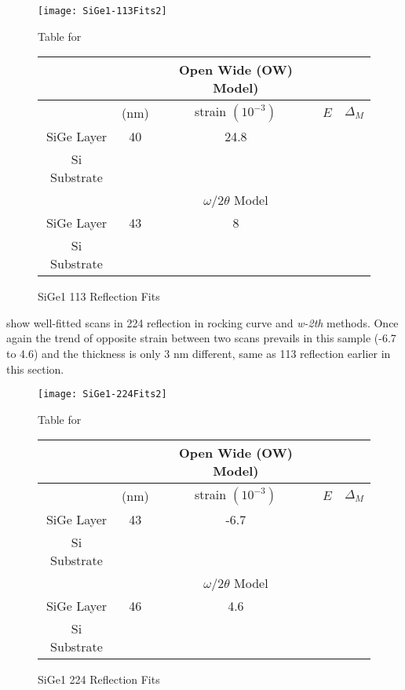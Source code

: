 \begin{figure}[hc]%
\caption{SiGe1 113 Reflection Fits}
\label{SiGe1-113}
\begin{minipage}{0.85\linewidth}
\texttt{[image: SiGe1-113Fits2]}
\end{minipage}
\begin{minipage}{\linewidth}
\centering
\vspace{10pt}
Table for \\
\vspace{5pt}
\begin{tabular}{c|cccc}
			& 	&Open Wide (OW) Model)	 \\
\hline
			&	(nm)	&	strain	 $(10^{-3})$&	$E$ &  $\Delta_M$\\
\hline
SiGe Layer		&  	40	&   24.8	 &\textendash & \textendash\ 	\\
Si Substrate		&	\textemdash & \textemdash&\textemdash\ &\textemdash	\\
\hline
			& &$\omega/2\theta$ Model \\
\hline
SiGe Layer		&	43	& 8	&\textendash&\textendash\ 	\\
Si Substrate		&	\textemdash & \textemdash&\textemdash\ &\textemdash
\end{tabular}
\end{minipage}
\end{figure}

  show well-fitted scans in 224 reflection in rocking curve and \emph{w-2th} methods.  Once again the trend of opposite strain between two scans prevails in this sample (-6.7 to 4.6) and the thickness is only 3 nm different, same as 113 reflection earlier in this section.  

\begin{figure}[hc]%
\caption{SiGe1 224 Reflection Fits}
\label{SiGe1-224}
\begin{minipage}{0.85\linewidth}
\texttt{[image: SiGe1-224Fits2]}
\end{minipage}
\begin{minipage}{\linewidth}
\centering
\vspace{10pt}
Table for \\
\vspace{5pt}
\begin{tabular}{c|cccc}
			& 	&Open Wide (OW) Model)	 \\
\hline
			&	(nm)	&	strain	 $(10^{-3})$&	$E$ &  $\Delta_M$\\
\hline
SiGe Layer		&  	43	&      -6.7 &\textendash & \textendash\ 	\\
Si Substrate		&	\textemdash & \textemdash&\textemdash\ &\textemdash	\\
\hline
			& &$\omega/2\theta$ Model \\
\hline
SiGe Layer		&	46	&4.6	&\textendash	&\textendash\ 	\\
Si Substrate		&	\textemdash & \textemdash&\textemdash\ &\textemdash
\end{tabular}
\end{minipage}
\end{figure}

